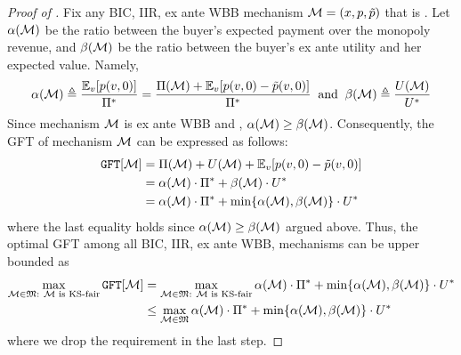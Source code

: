 \begin{proof}[Proof of ]
Fix any BIC, IIR, ex ante WBB mechanism $\mathcal{M}=(x,p,\tilde{p})$ that is {\ksfair}.  
Let $\alpha(\mathcal{M})$ be the ratio between the buyer's expected payment over the monopoly revenue, and $\beta(\mathcal{M})$ be the ratio between the buyer's ex ante utility and her expected value. Namely,
\begin{align*}
    \revratio(\mech) \triangleq  
    \frac{\expect[\val]{\price(\val,0)}}{\sellerbenchmark}
    =
    \frac{\sellerexanteutil(\mech) + \expect[\val]{\price(\val,0) - \sellerprice(\val,0)}}{\sellerbenchmark} 
    \;\;
    \mbox{and}
    \;\;
    \residuesurplusratio(\mech) \triangleq \frac{\buyerexanteutil(\mech)}{\buyerbenchmark}
\end{align*}
Since mechanism $\mathcal{M}$ is ex ante WBB and {\ksfair}, $\alpha(\mathcal{M}) \geq \beta(\mathcal{M})$. Consequently, the GFT of mechanism $\mathcal{M}$ can be expressed as follows:
\begin{align*}
    \GFT{\mech} 
    &= \sellerexanteutil(\mech) + \buyerexanteutil(\mech) + \expect[\val]{\price(\val,0) - \sellerprice(\val,0)}
    \\
    &=
    \revratio(\mech) \cdot \sellerbenchmark
    +
    \residuesurplusratio(\mech) \cdot \buyerbenchmark
    \\
    &=
    \revratio(\mech) \cdot \sellerbenchmark
    +
    \min\{\revratio(\mech), \residuesurplusratio(\mech)\} \cdot \buyerbenchmark
\end{align*}
where the last equality holds since $\alpha(\mathcal{M}) \geq \beta(\mathcal{M})$ argued above. Thus, the optimal GFT among all BIC, IIR, ex ante WBB, {\ksfair} mechanisms can be upper bounded as
\begin{align}
\nonumber
    \max_{\substack{\mech\in\mechfam:~\text{$\mech$ is {\ksfair}}}} \GFT{\mech}
    & =
    \max_{\substack{\mech\in\mechfam:~\text{$\mech$ is {\ksfair}}}}  \revratio(\mech) \cdot \sellerbenchmark
    +
    \min\{\revratio(\mech), \residuesurplusratio(\mech)\} \cdot \buyerbenchmark
    \\
\label{eq:fixed price mech suffices:regular UB}
    &\leq 
    \max_{\substack{\mech\in\mechfam}}  \revratio(\mech) \cdot \sellerbenchmark
    +
    \min\{\revratio(\mech), \residuesurplusratio(\mech)\} \cdot \buyerbenchmark
\end{align}
where we drop the {\ksfairness} requirement in the last step. 


\end{proof}
